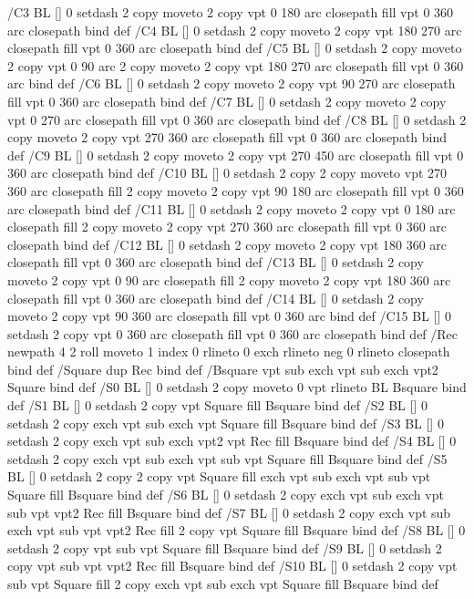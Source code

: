 /C3 {BL [] 0 setdash 2 copy moveto
	2 copy vpt 0 180 arc closepath fill
	vpt 0 360 arc closepath} bind def
/C4 {BL [] 0 setdash 2 copy moveto
	2 copy vpt 180 270 arc closepath fill
	vpt 0 360 arc closepath} bind def
/C5 {BL [] 0 setdash 2 copy moveto
	2 copy vpt 0 90 arc
	2 copy moveto
	2 copy vpt 180 270 arc closepath fill
	vpt 0 360 arc} bind def
/C6 {BL [] 0 setdash 2 copy moveto
	2 copy vpt 90 270 arc closepath fill
	vpt 0 360 arc closepath} bind def
/C7 {BL [] 0 setdash 2 copy moveto
	2 copy vpt 0 270 arc closepath fill
	vpt 0 360 arc closepath} bind def
/C8 {BL [] 0 setdash 2 copy moveto
	2 copy vpt 270 360 arc closepath fill
	vpt 0 360 arc closepath} bind def
/C9 {BL [] 0 setdash 2 copy moveto
	2 copy vpt 270 450 arc closepath fill
	vpt 0 360 arc closepath} bind def
/C10 {BL [] 0 setdash 2 copy 2 copy moveto vpt 270 360 arc closepath fill
	2 copy moveto
	2 copy vpt 90 180 arc closepath fill
	vpt 0 360 arc closepath} bind def
/C11 {BL [] 0 setdash 2 copy moveto
	2 copy vpt 0 180 arc closepath fill
	2 copy moveto
	2 copy vpt 270 360 arc closepath fill
	vpt 0 360 arc closepath} bind def
/C12 {BL [] 0 setdash 2 copy moveto
	2 copy vpt 180 360 arc closepath fill
	vpt 0 360 arc closepath} bind def
/C13 {BL [] 0 setdash 2 copy moveto
	2 copy vpt 0 90 arc closepath fill
	2 copy moveto
	2 copy vpt 180 360 arc closepath fill
	vpt 0 360 arc closepath} bind def
/C14 {BL [] 0 setdash 2 copy moveto
	2 copy vpt 90 360 arc closepath fill
	vpt 0 360 arc} bind def
/C15 {BL [] 0 setdash 2 copy vpt 0 360 arc closepath fill
	vpt 0 360 arc closepath} bind def
/Rec {newpath 4 2 roll moveto 1 index 0 rlineto 0 exch rlineto
	neg 0 rlineto closepath} bind def
/Square {dup Rec} bind def
/Bsquare {vpt sub exch vpt sub exch vpt2 Square} bind def
/S0 {BL [] 0 setdash 2 copy moveto 0 vpt rlineto BL Bsquare} bind def
/S1 {BL [] 0 setdash 2 copy vpt Square fill Bsquare} bind def
/S2 {BL [] 0 setdash 2 copy exch vpt sub exch vpt Square fill Bsquare} bind def
/S3 {BL [] 0 setdash 2 copy exch vpt sub exch vpt2 vpt Rec fill Bsquare} bind def
/S4 {BL [] 0 setdash 2 copy exch vpt sub exch vpt sub vpt Square fill Bsquare} bind def
/S5 {BL [] 0 setdash 2 copy 2 copy vpt Square fill
	exch vpt sub exch vpt sub vpt Square fill Bsquare} bind def
/S6 {BL [] 0 setdash 2 copy exch vpt sub exch vpt sub vpt vpt2 Rec fill Bsquare} bind def
/S7 {BL [] 0 setdash 2 copy exch vpt sub exch vpt sub vpt vpt2 Rec fill
	2 copy vpt Square fill Bsquare} bind def
/S8 {BL [] 0 setdash 2 copy vpt sub vpt Square fill Bsquare} bind def
/S9 {BL [] 0 setdash 2 copy vpt sub vpt vpt2 Rec fill Bsquare} bind def
/S10 {BL [] 0 setdash 2 copy vpt sub vpt Square fill 2 copy exch vpt sub exch vpt Square fill
	Bsquare} bind def
